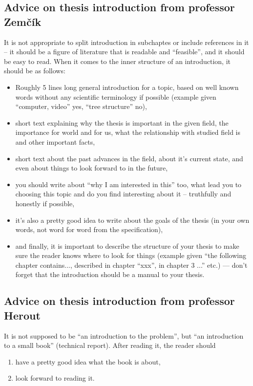 \subsection{Advice on thesis introduction from professor Zemčík}
It is not appropriate to split introduction in subchaptes or include references in it -- it should be a figure of literature that is readable and ``feasible'', and it should be easy to read. When it comes to the inner structure of an introduction, it should be as follows:
\begin{itemize}
  \item{Roughly 5 lines long general introduction for a topic, based on well known words without any scientific terminology if possible (example given ``computer, video'' yes, ``tree structure'' no),}
  \item{short text explaining why the thesis is important in the given field, the importance for world and for us, what the relationship with studied field is and other important facts,}
  \item{short text about the past advances in the field, about it's current state, and even about things to look forward to in the future,}
  \item{you should write about ``why I am interested in this'' too, what lead you to choosing this topic and do you find interesting about it -- truthfully and honestly if possible,}
  \item{it's also a pretty good idea to write about the goals of the thesis (in your own words, not word for word from the specification),}
  \item{and finally, it is important to describe the structure of your thesis to make sure the reader knows where to look for things (example given ``the following chapter contains..., described in chapter ``xxx'', in chapter 3 ...'' etc.) --- don't forget that the introduction should be a manual to your thesis.}
\end{itemize}

\begin{samepage}
\subsection{Advice on thesis introduction from professor Herout}
It is not supposed to be ``an introduction to the problem'', but ``an introduction to a small book'' (technical report). After reading it, the reader should
\begin{enumerate}
  \item{have a pretty good idea what the book is about,}
  \item{look forward to reading it.}
\end{enumerate}
\end{samepage}

